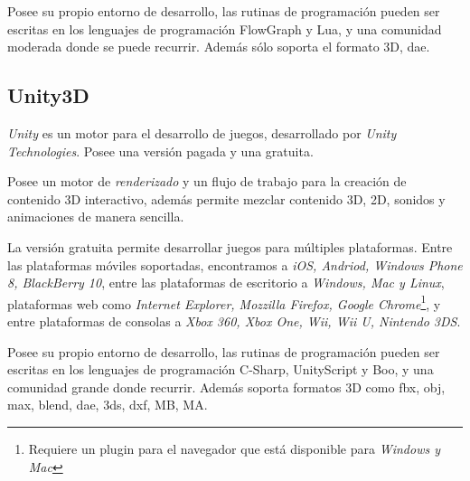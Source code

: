 Posee su propio entorno de desarrollo, las rutinas de programación pueden ser 
escritas en los lenguajes de programación FlowGraph y Lua, y una 
comunidad moderada donde se puede recurrir. Además sólo soporta el formato 
3D, dae\cite{shiva}.





\subsection{Unity3D}

\textit{Unity} es un motor para el desarrollo de juegos,
desarrollado por \textit{Unity Technologies}. Posee una versión pagada 
y una gratuita\cite{unity3d}.

Posee un motor de \textit{renderizado} y un flujo de trabajo para la creación 
de contenido 3D interactivo, además permite mezclar contenido 3D, 2D, sonidos 
y animaciones de manera sencilla\cite{unity3d}.

La versión gratuita permite desarrollar juegos para múltiples plataformas. 
Entre las plataformas móviles soportadas, encontramos a \textit{iOS, Andriod, 
Windows Phone 8, BlackBerry 10}, entre las plataformas de escritorio a 
\textit{Windows, Mac y Linux}, plataformas web como \textit{Internet Explorer, 
Mozzilla Firefox, Google Chrome}\footnote{Requiere un plugin para el navegador que está
disponible para \textit{Windows y Mac}}, y entre plataformas de consolas a
\textit{Xbox 360, Xbox One, Wii, Wii U, Nintendo 3DS}\cite{unity3d}.

Posee su propio entorno de desarrollo, las rutinas de programación pueden ser 
escritas en los lenguajes de programación C-Sharp, UnityScript y Boo, y una 
comunidad grande donde recurrir. Además soporta formatos 3D como fbx, obj, max, 
blend, dae, 3ds, dxf, MB, MA\cite{unity3d}.

